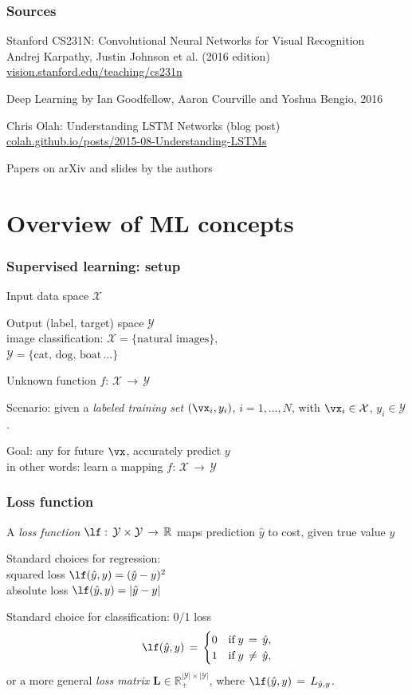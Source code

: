 \documentclass[xcolor=dvipsnames]{beamer}
\begin{document}
\begin{frame}
  \frametitle{Sources}
  \bi
\item Stanford CS231N: Convolutional Neural Networks for Visual
  Recognition\\
Andrej Karpathy, Justin Johnson et al. (2016 edition)\\
\url{vision.stanford.edu/teaching/cs231n}
\item Deep Learning by Ian Goodfellow, Aaron Courville and Yoshua
  Bengio, 2016
\item Chris Olah: Understanding LSTM Networks (blog post)\\
\url{colah.github.io/posts/2015-08-Understanding-LSTMs}
\item Papers on arXiv and slides by the authors
\ei
\end{frame}


\section{Overview of ML concepts}
\begin{frame}
  \frametitle{Supervised learning: setup}
  \bi
\item Input data space $\mathcal{X}$
\item Output (label, target) space $\mathcal{Y}$\\
image classification: $\mathcal{X} = \{\text{natural images} \}$,\\
$\mathcal{Y}=\{\text{cat},\,\text{dog},\,\text{boat}\,\ldots\}$
\item Unknown function $f:\,\mathcal{X}\,\to\,\mathcal{Y}$
\item Scenario: given a \emph{labeled training set} $(\vx_i,y_i)$,
  $i=1,\ldots,N$, with $\vx_i\in\mathcal{X}$, $y_i\in\mathcal{Y}$.
\item Goal: any for future $\vx$, accurately predict $y$\\
in other words: learn a mapping $f:\,\mathcal{X}\,\to\,\mathcal{Y}$
\ei

\end{frame}


\begin{frame}\frametitle{Loss function}
 \bi
 \item A \emph{loss function}
   $\lf:\,\mathcal{Y}\times\mathcal{Y}\,\to\,\mathbb{R}$ maps
   prediction $\hat{y}$ to
   cost, given true value $y$
 \item Standard choices for regression:\\ 
 squared loss $\lf(\hat{y},y)=(\hat{y}-y)^2$\\
 absolute loss $\lf(\hat{y},y)=|\hat{y}-y|$
\item Standard choice for classification: 0/1 loss
 \[\lf(\hat{y},y)\,=\,
   \begin{cases}
     0 & \text{if}\;y\,=\,\hat{y},\\
     1 & \text{if}\;y\,\ne\,\hat{y},
   \end{cases}
 \]
 or a more general \emph{loss matrix}
 $\mathbf{L}\in\mathbb{R}_{+}^{|\mathcal{Y}|\times|\mathcal{Y}|}$,
 where $\lf(\hat{y},y)\,=\,L_{\hat{y},y}$.
 \ei
 \end{frame}
\end{document}
